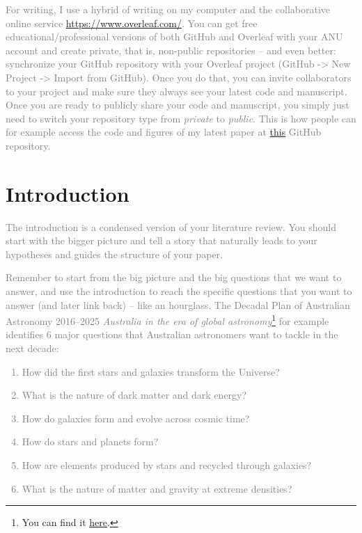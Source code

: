 \documentclass[
  journal=pasa,
  manuscript=Research-Article,
  year=2025,
  volume=X,
]{cup-journal}
\newcommand{\comment}[1]{\textcolor{gray}{#1}}
\begin{document}
\comment{For writing, I use a hybrid of writing on my computer and the collaborative online service \url{https://www.overleaf.com/}. You can get free educational/professional versions of both GitHub and Overleaf with your ANU account and create private, that is, non-public repositories -- and even better: synchronize your GitHub repository with your Overleaf project (GitHub -> New Project -> Import from GitHub). Once you do that, you can invite collaborators to your project and make sure they always see your latest code and manuscript. Once you are ready to publicly share your code and manuscript, you simply just need to switch your repository type from \textit{private} to \textit{public}. This is how people can for example access the code and figures of my latest paper \citep{Buder2024} at \href{https://github.com/svenbuder/Accretion_Clues_ObsSim}{this} GitHub repository.}

\clearpage
\section{Introduction}
\label{sec:introduction}

\comment{The introduction is a condensed version of your literature review. You should start with the bigger picture and tell a story that naturally leads to your hypotheses and guides the structure of your paper.}

\comment{Remember to start from the big picture and the big questions that we want to answer, and use the introduction to reach the specific questions that you want to answer (and later link back) -- like an hourglass. The Decadal Plan of Australian Astronomy 2016--2025 \textit{Australia in the era of global astronomy}\footnote{You can find it \href{https://www.science.org.au/supporting-science/science-sector-analysis/reports-and-publications/decadal-plan-australian-astronomy-2016-25}{here}.} for example identifies 6 major questions that Australian astronomers want to tackle in the next decade: 
\begin{enumerate}
    \item How did the first stars and galaxies transform the Universe?
    \item What is the nature of dark matter and dark energy?
    \item How do galaxies form and evolve across cosmic time?
    \item How do stars and planets form?
    \item How are elements produced by stars and recycled through galaxies?
    \item What is the nature of matter and gravity at extreme densities?
\end{enumerate}}
\end{document}
